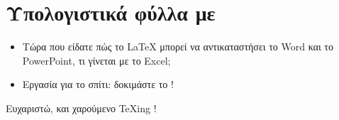 \documentclass{beamer}
\begin{document}
\section{Υπολογιστικά φύλλα με \en \protect{}}\gr

\begin{frame}[fragile]{\insertsection}
\begin{itemize}
\item
Τώρα που είδατε πώς το \LaTeX{} μπορεί να αντικαταστήσει το \en Word \gr και το \en PowerPoint, \gr τι γίνεται με το \en Excel;\gr
\item Εργασία για το σπίτι: δοκιμάστε το !
\end{itemize}
\end{frame}

\begin{frame}
\begin{center}
Ευχαριστώ, και χαρούμενο  \TeX{}\en ing \gr!
\end{center}
\end{frame}
\end{document}
